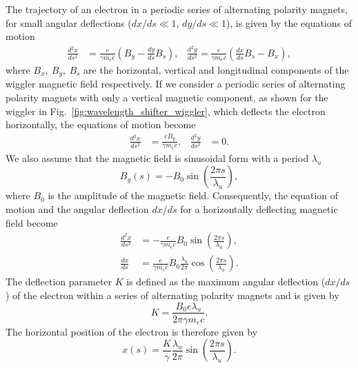 \documentclass[../main.tex]{subfiles}
\begin{document}
The trajectory of an electron in a periodic series of alternating polarity magnets, for small angular deflections ($dx/ds \ll 1$, $dy/ds \ll 1$), is given by the equations of motion
\begin{align}
\frac{d^{2}x}{ds^{2}} &= \frac{e}{\gamma m_{e}c}\left(B_{y}-\frac{dy}{ds}B_{s}\right), & \frac{d^{2}y}{ds^{2}} = \frac{e}{\gamma m_{e}c}\left(\frac{dx}{ds}B_{s}-B_{x}\right), 
\label{eq:undulator_equations_of_motion}    
\end{align}
where $B_{x},~B_{y},~B_{s}$ are the horizontal, vertical and longitudinal components of the wiggler magnetic field respectively. If we consider a periodic series of alternating polarity magnets with only a vertical magnetic component, as shown for the wiggler in Fig.~\ref{fig:wavelength_shifter_wiggler}, which deflects the electron horizontally, the equations of motion become
\begin{align}
\frac{d^{2}x}{ds^{2}} &= \frac{eB_{y}}{\gamma m_{e}c}, & \frac{d^{2}y}{ds^{2}} &= 0.
\label{eq:planar_undulator_equations_of_motion}    
\end{align}
We also assume that the magnetic field is sinusoidal form with a period $\lambda_{u}$
\begin{equation}
B_{y}\left(s\right) = -B_{0}\sin\left(\frac{2\pi s}{\lambda_{u}}\right),
\label{eq:wiggler_magnetic_field}    
\end{equation}
where $B_{0}$ is the amplitude of the magnetic field. Consequently, the equation of motion and the angular deflection $dx/ds$ for a horizontally deflecting magnetic field become
\begin{align}
\frac{d^{2}x}{ds^{2}} &= -\frac{e}{\gamma m_{e}c}B_{0}\sin\left(\frac{2\pi s}{\lambda_{u}}\right), \\
\frac{dx}{ds} &= \frac{e}{\gamma m_{e}c}B_{0}\frac{\lambda_{u}}{2\pi}\cos\left(\frac{2\pi s}{\lambda_{u}}\right).
\label{eq:undulator_eq_of_motion_deflection}
\end{align}
The deflection parameter $K$ is defined as the maximum angular deflection ($dx/ds$) of the electron within a series of alternating polarity magnets and is given by
\begin{equation}
K = \frac{B_{0}e\lambda_{u}}{2\pi\gamma m_{e}c}.
\label{eq:deflection_parameter}    
\end{equation}
The horizontal position of the electron is therefore given by 
\begin{equation}
x\left(s\right) = \frac{K}{\gamma}\frac{\lambda_{u}}{2\pi}\sin\left(\frac{2\pi s}{\lambda_{u}}\right).
\label{eq:x_electron_undulator}    
\end{equation}
\end{document}
